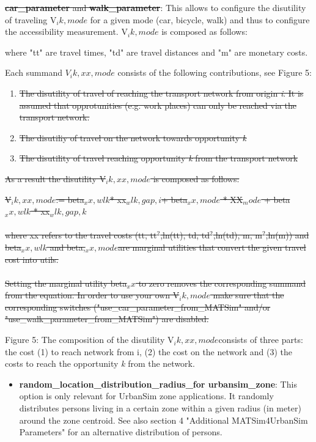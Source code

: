 \documentclass[a4paper,11pt]{report}
\begin{document}
\begin{itemize}
\begin{itemize}
\sout{\textbf{car\_parameter} and \textbf{walk\_parameter}}: This allows to configure the disutility of traveling V$_ik,mode$ for a given mode (car, bicycle, walk) and thus to configure the accessibility measurement. V$_ik,mode$ is composed as follows:


     where "tt" are travel times, "td" are travel distances and "m" are monetary costs.

     Each summand $V_ik,xx,mode$ consists of the following contributions, see Figure 5:
\begin{enumerate}
	\item \sout{The disutility of travel of reaching the transport network from origin \emph{i}. It is assumed that opprotunities (e.g. work places) can only be reached via the transport network.}
	\item \sout{The disutiliy of travel on the network towards opportunity \emph{k}}
	\item \sout{The disutility of travel reaching opportunity \emph{k} from the transport network}
\end{enumerate}
\end{itemize}
\end{itemize}

\sout{As a result the disutility V$_ik,xx,mode$ is composed as follows:}

\sout{V$_ik,xx,mode$:= beta$_xx,wlk$* xx$_wlk,gap,i $+ beta$_xx,mode$ * XX$_mode$ + beta$_xx,wlk$ * xx$_wlk,gap,k$
\\
\\  where xx refers to the travel costs (tt, tt$^2$,ln(tt), td, td$^2$,ln(td), m, m$^2$,ln(m)) and beta$_xx,wlk$ and beta,$_xx,mode $are marginal utilities that convert the given travel cost into utils.
\\
\\  Setting the marginal utility beta$_xx$ to zero removes the corresponding summand from the equation. In order to use your own V$_ik,mode$  make sure that the corresponding switches  ("use\_car\_parameter\_from\_MATSim" and/or  "use\_walk\_parameter\_from\_MATSim") are disabled.}



Figure 5: The composition of the disutility V$_ik,xx,mode $consists  of three parts: the cost (1) to reach network from i, (2) the cost on  the network and (3) the costs to reach the opportunity \emph{k} from the network.
\begin{itemize}
	\item \textbf{random\_location\_distribution\_radius\_for urbansim\_zone}:  This option is only relevant for UrbanSim zone applications. It  randomly distributes persons living in a certain zone within a given  radius (in meter) around the zone centroid. See also section 4  "Additional MATSim4UrbanSim Parameters" for an alternative distribution  of persons.
\end{itemize}
\end{document}
